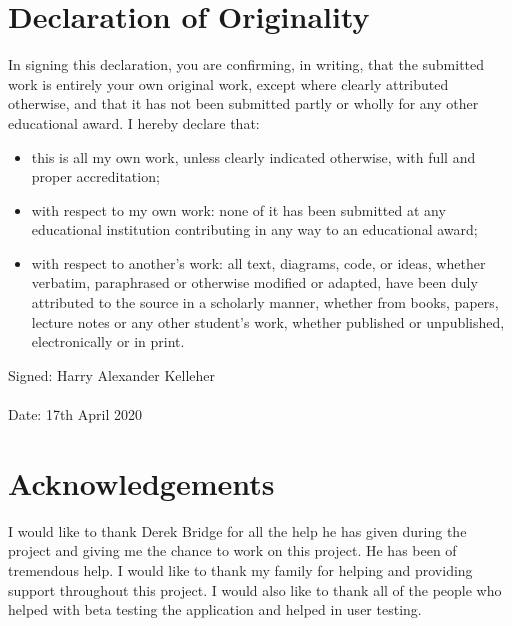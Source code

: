 \documentclass[12pt]{report}
\begin{document}
\chapter*{Declaration of Originality}
        In signing this declaration, you are confirming, in writing, that the submitted work
        is entirely your own original work, except where clearly attributed otherwise, and
        that it has not been submitted partly or wholly for any other educational award. I
        hereby declare that:
        \begin{itemize}
            \item this is all my own work, unless clearly indicated otherwise, with full and proper accreditation;  
            \item with respect to my own work: none of it has been submitted at any educational institution contributing in any way to an educational award;
            \item with respect to another’s work: all text, diagrams, code, or ideas, whether verbatim, paraphrased or otherwise modified or adapted, 
            have been duly attributed to the source in a scholarly manner, whether from books, papers, lecture notes or any other student’s work, whether
            published or unpublished, electronically or in print.
        \end{itemize}
        \vspace{10mm}
        Signed: \dotfill Harry Alexander Kelleher \dotfill
        \\\\
        Date: \dotfill 17th April 2020 \dotfill


\chapter*{Acknowledgements}
    I would like to thank Derek Bridge for all the help he has given during the project and giving me the chance to work on this project. He has been of tremendous help. I would like to thank my family for helping and providing support throughout this project. I would also like to thank all of the people who helped with beta testing the application and helped in user testing. 
   


\tableofcontents
    \thispagestyle{empty}
    

\listoffigures  
    \thispagestyle{empty}
\end{document}
